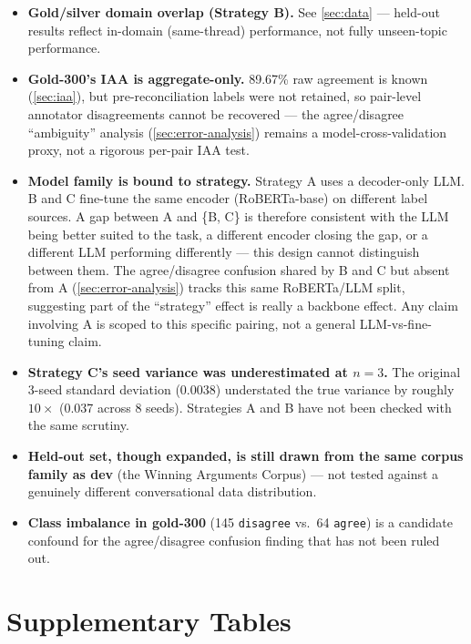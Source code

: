 \begin{itemize}
\item \textbf{Gold/silver domain overlap (Strategy B).} See
      \autoref{sec:data} --- held-out results reflect in-domain
      (same-thread) performance, not fully unseen-topic performance.
\item \textbf{Gold-300's IAA is aggregate-only.} 89.67\% raw agreement is
      known (\autoref{sec:iaa}), but pre-reconciliation labels were not
      retained, so pair-level annotator disagreements cannot be recovered
      --- the agree/disagree ``ambiguity'' analysis
      (\autoref{sec:error-analysis}) remains a model-cross-validation
      proxy, not a rigorous per-pair IAA test.
\item \textbf{Model family is bound to strategy.} Strategy A uses a
      decoder-only LLM. B and C fine-tune the same encoder (RoBERTa-base)
      on different label sources. A gap between A and \{B, C\} is
      therefore consistent with the LLM being better suited to the task,
      a different encoder closing the gap, or a different LLM performing
      differently --- this design cannot distinguish between them. The
      agree/disagree confusion shared by B and C but absent from A
      (\autoref{sec:error-analysis}) tracks this same RoBERTa/LLM
      split, suggesting part of the ``strategy'' effect is really a
      backbone effect. Any claim involving A is scoped to this specific
      pairing, not a general LLM-vs-fine-tuning claim.
\item \textbf{Strategy C's seed variance was underestimated at $n=3$.} The
      original 3-seed standard deviation (0.0038) understated the true
      variance by roughly $10\times$ (0.037 across 8 seeds). Strategies A
      and B have not been checked with the same scrutiny.
\item \textbf{Held-out set, though expanded, is still drawn from the same
      corpus family as dev} (the Winning Arguments Corpus) --- not tested
      against a genuinely different conversational data distribution.
\item \textbf{Class imbalance in gold-300} (145 \texttt{disagree} vs.\ 64
      \texttt{agree}) is a candidate confound for the agree/disagree
      confusion finding that has not been ruled out.
\end{itemize}


\appendix
\chapter{Supplementary Tables}
\label{app:extra-matrices}

